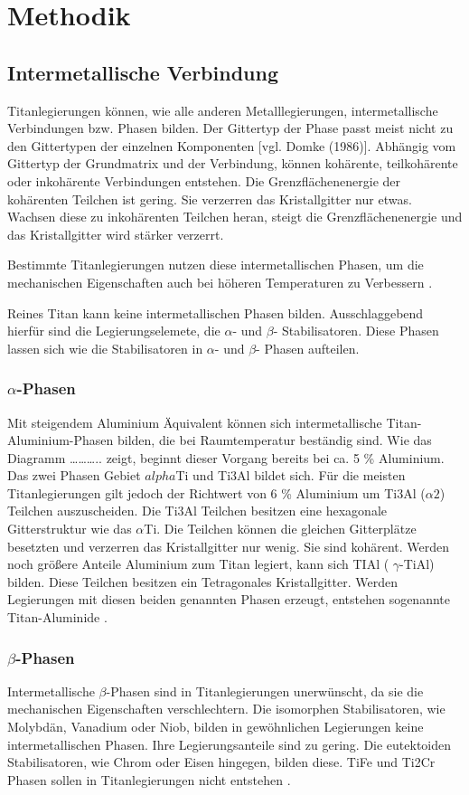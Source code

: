 \documentclass[a4paper, 11pt]{tubsreprt}
\begin{document}
\chapter{Methodik}
\section{Intermetallische Verbindung}
Titanlegierungen können, wie alle anderen Metalllegierungen, intermetallische Verbindungen bzw. Phasen bilden. Der Gittertyp der Phase passt meist nicht zu den Gittertypen der einzelnen Komponenten [vgl. Domke (1986)]. Abhängig vom Gittertyp der Grundmatrix und der Verbindung,  können kohärente, teilkohärente oder inkohärente Verbindungen entstehen. Die Grenzflächenenergie der kohärenten Teilchen ist gering. Sie verzerren das Kristallgitter nur etwas. Wachsen diese zu inkohärenten Teilchen heran, steigt die Grenzflächenenergie und das Kristallgitter wird stärker verzerrt.

Bestimmte Titanlegierungen nutzen diese intermetallischen Phasen, um die mechanischen Eigenschaften auch bei höheren Temperaturen zu Verbessern \cite{Luetjering2007}.

Reines Titan kann keine intermetallischen Phasen bilden. Ausschlaggebend hierfür sind die Legierungselemete, die $\alpha$- und $\beta$- Stabilisatoren.  Diese Phasen lassen sich wie die Stabilisatoren  in $\alpha$- und $\beta$- Phasen aufteilen.  
\subsection{$\alpha$-Phasen}
Mit steigendem Aluminium Äquivalent können sich intermetallische Titan-Aluminium-Phasen bilden, die bei Raumtemperatur beständig sind. Wie das Diagramm ……….. zeigt, beginnt dieser Vorgang bereits bei ca. 5 \% Aluminium. Das zwei Phasen Gebiet $alpha$Ti und Ti3Al bildet sich. Für die meisten Titanlegierungen gilt jedoch der Richtwert von 6 \% Aluminium um Ti3Al ($\alpha2$) Teilchen auszuscheiden.  Die Ti3Al Teilchen besitzen eine hexagonale Gitterstruktur wie das $\alpha$Ti. Die Teilchen können  die gleichen Gitterplätze besetzten und verzerren das Kristallgitter nur wenig. Sie sind kohärent.
Werden noch größere Anteile Aluminium  zum Titan legiert, kann sich TIAl ( $\gamma$-TiAl) bilden. Diese Teilchen besitzen ein Tetragonales Kristallgitter.
 Werden Legierungen mit diesen beiden genannten Phasen erzeugt, entstehen sogenannte Titan-Aluminide \cite[vgl.]{Luetjering2007}.   

\subsection{$\beta$-Phasen}
Intermetallische $\beta$-Phasen sind in Titanlegierungen unerwünscht, da sie die mechanischen Eigenschaften verschlechtern. Die isomorphen Stabilisatoren, wie Molybdän, Vanadium oder Niob, bilden in gewöhnlichen Legierungen keine intermetallischen Phasen. Ihre Legierungsanteile sind zu gering. Die eutektoiden Stabilisatoren, wie Chrom oder Eisen hingegen, bilden diese. TiFe und Ti2Cr Phasen sollen in Titanlegierungen nicht entstehen \cite{Luetjering2007}.
\end{document}
